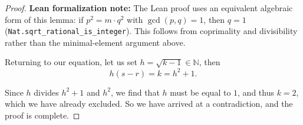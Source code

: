 \begin{proof}
\textbf{Lean formalization note:} The Lean proof uses an equivalent algebraic form of this
lemma: if $p^2 = m \cdot q^2$ with $\gcd(p,q) = 1$, then $q = 1$
(\texttt{Nat.sqrt\_rational\_is\_integer}). This follows from coprimality and divisibility
rather than the minimal-element argument above.

Returning to our equation, let us set $h = \sqrt{k - 1} \in \mathbb{N}$, then
\[
h(s - r) = k = h^2 + 1.
\]

Since $h$ divides $h^2 + 1$ and $h^2$, we find that $h$ must be equal to $1$, and thus $k = 2$,
which we have already excluded. So we have arrived at a contradiction, and the proof is complete.
\end{proof}
